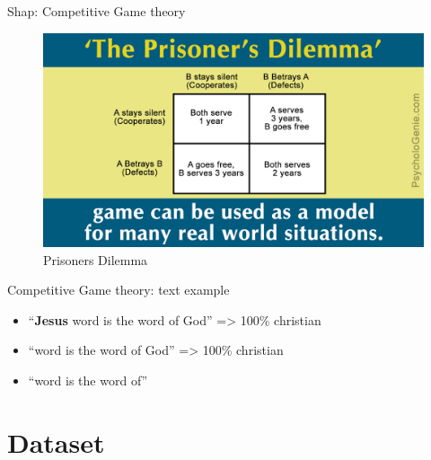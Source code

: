 \documentclass[en]{sdqbeamer}
\begin{document}
\begin{large}
\begin{frame}{Shap: Competitive Game theory}
    \begin{figure}[H]
    \centering
    \includegraphics[width=\linewidth,height=0.6\textheight,keepaspectratio]{images/Prisoners dilemma.png}
    \caption{Prisoners Dilemma \cite{psychologenie_2014}}
    \label{fig:prisonersDilemma}
\end{figure}

\end{frame}

\begin{frame}{Competitive Game theory: text example}
    \begin{itemize}
        \item \enquote{\textbf{Jesus} word is the word of God} => 100\% christian
        \item \enquote{word is the word of God} => 100\% christian
        \vspace{1cm}
        \pause
        \item \enquote{word is the word of}
    \end{itemize}
\end{frame}

\section{Dataset}


\end{large}
\end{document}
